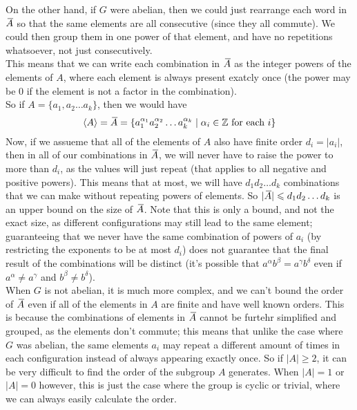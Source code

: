 \documentclass[12pt]{article}
\begin{document}
    On the other hand, if $G$ were abelian,
    then we could just rearrange each word in $\,\overline{\!{A}}$
    so that the same elements are all consecutive
    (since they all commute).
    We could then group them in one power of that element,
    and have no repetitions whatsoever,
    not just consecutively. \\
    This means that we can write each combination in $\,\overline{\!{A}}$
    as the integer powers of the elements of $A$,
    where each element is always present exatcly once
    (the power may be 0
    if the element is not a factor in the combination). \\
    So if $A = \{ a_1, a_2 \dots a_k \}$,
    then we would have
    \[ \left\langle A \right\rangle = \,\overline{\!{A}} 
    = \{ a_1^{\alpha_1}a_2^{\alpha_2} \dots a_k^{\alpha_k} \mid
    \alpha_i \in \mathbb{Z} \text{ for each } i \} \]
    Now, if we assueme that all of the elements of $A$
    also have finite order $d_i = |a_i|$,
    then in all of our combinations in $\,\overline{\!{A}}$,
    we will never have to raise the power to more than
    $d_i$,
    as the values will just repeat
    (that applies to all negative and positive powers).
    This means that at most,
    we will have $d_1d_2\dots d_k$ combinations
    that we can make without repeating powers of elements.
    So $|\,\overline{\!{A}}| \leqslant d_1d_2\dots d_k$
    is an upper bound on the size of $\,\overline{\!{A}}$.
    Note that this is only a bound, and not the exact size,
    as different configurations may still lead to the same element;
    guaranteeing that we never have the same 
    combination of powers of $a_i$
    (by restricting the exponents to be at most $d_i$)
    does not guarantee that the final result of the combinations
    will be distinct
    (it's possible that $a^\alpha b^\beta = a^\gamma b^\delta$
    even if $a^\alpha \neq a^\gamma$ and  $b^\beta \neq b^\delta$). \\
    When $G$ is not abelian,
    it is much more complex,
    and we can't bound the order of $\,\overline{\!{A}}$
    even if all of the elements in $A$ are finite and have
    well known orders.
    This is because the combinations of elements in $\,\overline{\!{A}}$
    cannot be furtehr simplified and grouped,
    as the elements don't commute;
    this means that unlike the case where $G$ was abelian,
    the same elements $a_i$
    may repeat a different amount of times in each configuration
    instead of always appearing exactly once.
    So if $|A| \geqslant 2$,
    it can be very difficult to find the order of
    the subgroup $A$ generates.
    When $|A| = 1$ or $|A| = 0$ however,
    this is just the case where the group is cyclic or trivial,
    where we can always easily calculate the order. \\
\end{document}
